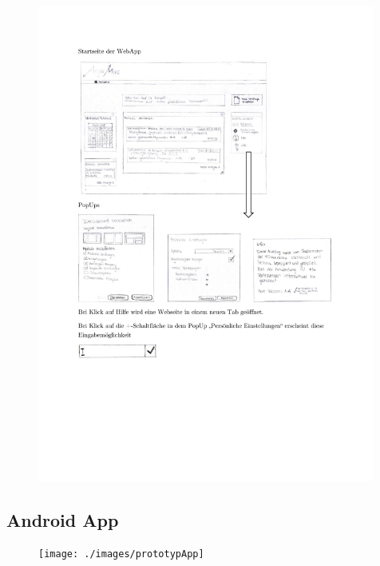 \begin{figure}
  \vspace{-20pt}
  \begin{center}
    \includegraphics[page=5,width=0.99\textwidth]{./images/prototypWeb}
  \end{center}
  \vspace{-40pt}
\end{figure}

\subsection{Android App}


\begin{figure}
  \vspace{-20pt}
  \begin{center}
    \texttt{[image: ./images/prototypApp]}
  \end{center}
  \vspace{-40pt}
\end{figure}


